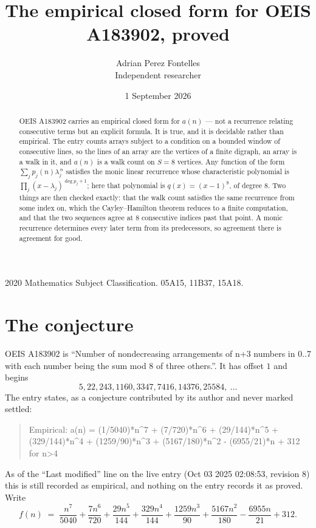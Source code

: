 \documentclass[11pt,a4paper]{article}
\title{The empirical closed form for OEIS A183902, proved}
\author{Adrian Perez Fontelles\\ \small Independent researcher}
\date{1 September 2026}
\theoremstyle{plain}
\theoremstyle{definition}
\begin{document}
\maketitle

\begin{abstract}
OEIS A183902 carries an empirical closed form for $a(n)$ --- not a recurrence relating
consecutive terms but an explicit formula. It is true, and it is decidable rather than
empirical. The entry counts arrays subject to a condition on a bounded window of consecutive lines, so the lines of an array are the
vertices of a finite digraph, an array is a walk in it, and $a(n)$ is a walk count on
$S=8$ vertices. Any function of the form $\sum_j p_j(n)\lambda_j^{\,n}$ satisfies the
monic linear recurrence whose characteristic polynomial is
$\prod_j(x-\lambda_j)^{\deg p_j+1}$; here that polynomial is $q(x)=(x-1)^{8}$, of degree
$8$. Two things are then checked exactly: that the walk count satisfies the same
recurrence from some index on, which the Cayley--Hamilton theorem reduces to a finite
computation, and that the two sequences agree at $8$ consecutive indices past that
point. A monic recurrence determines every later term from its predecessors, so agreement
there is agreement for good.
\end{abstract}

\noindent\small 2020 Mathematics Subject Classification. 05A15, 11B37, 15A18.\normalsize

\section{The conjecture}

OEIS A183902 is ``Number of nondecreasing arrangements of n+3 numbers in 0..7 with each number being the sum mod 8 of three others.''. It has offset $1$ and begins
\[
5, 22, 243, 1160, 3347, 7416, 14376, 25584,\ \dots
\]
The entry states, as a conjecture contributed by its author and never marked settled:
\begin{quote}
Empirical: a(n) = (1/5040)*n\^{}7 + (7/720)*n\^{}6 + (29/144)*n\^{}5 + (329/144)*n\^{}4 + (1259/90)*n\^{}3 + (5167/180)*n\^{}2 - (6955/21)*n + 312 for n>4
\end{quote}
As of the ``Last modified'' line on the live entry (Oct 03 2025 02:08:53, revision 8) this is still
recorded as empirical, and nothing on the entry records it as proved. Write
\[
f(n)\;=\;\frac{n^{7}}{5040} + \frac{7 n^{6}}{720} + \frac{29 n^{5}}{144} + \frac{329 n^{4}}{144} + \frac{1259 n^{3}}{90} + \frac{5167 n^{2}}{180} - \frac{6955 n}{21} + 312.
\]
\end{document}
